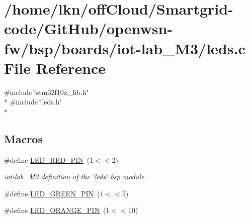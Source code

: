 \hypertarget{iot-lab___m3_2leds_8c}{}\section{/home/lkn/off\+Cloud/\+Smartgrid-\/code/\+Git\+Hub/openwsn-\/fw/bsp/boards/iot-\/lab\+\_\+\+M3/leds.c File Reference}
\label{iot-lab___m3_2leds_8c}
{\ttfamily \#include \char`\"{}stm32f10x\+\_\+lib.\+h\char`\"{}}\\*
{\ttfamily \#include \char`\"{}leds.\+h\char`\"{}}\\*
\subsection*{Macros}
\begin{DoxyCompactItemize}
\item 
\#define \hyperlink{iot-lab___m3_2leds_8c_ab9824ab080c30006c1baaa0dd7e863c5}{L\+E\+D\+\_\+\+R\+E\+D\+\_\+\+P\+IN}~(1$<$$<$2)
\begin{DoxyCompactList}\small\item\em iot-\/lab\+\_\+\+M3 definition of the \char`\"{}leds\char`\"{} bsp module. \end{DoxyCompactList}\item 
\#define \hyperlink{iot-lab___m3_2leds_8c_a0539be032702009fb24beec89c6fa0c0}{L\+E\+D\+\_\+\+G\+R\+E\+E\+N\+\_\+\+P\+IN}~(1$<$$<$5)
\item 
\#define \hyperlink{iot-lab___m3_2leds_8c_aea00e65d8db15efe130e134943eec5a7}{L\+E\+D\+\_\+\+O\+R\+A\+N\+G\+E\+\_\+\+P\+IN}~(1$<$$<$10)
\end{DoxyCompactItemize}
